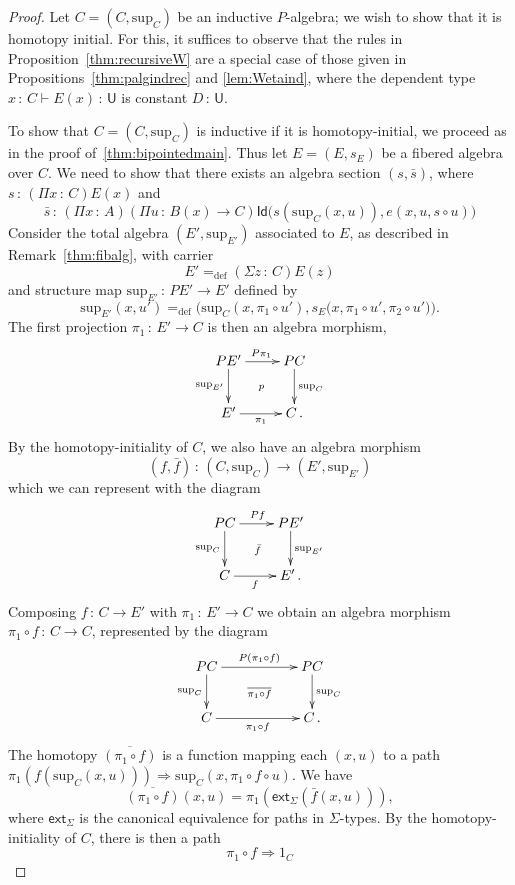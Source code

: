 \documentclass[10pt,a4paper,oneside,reqno]{amsart}
\theoremstyle{mythm}
\theoremstyle{mydef}
\theoremstyle{myrmk}
\newcommand{\defeq}{=_{\mathrm{def}}}
\newcommand{\co}{\,{:}\,}
\newcommand{\com}{\circ}
\newcommand{\ext}{\mathsf{ext}}
\newcommand{\idtodpair}{\ext_\Sigma}
\newcommand{\Id}{\mathsf{Id}}
\newcommand{\U}{\mathsf{U}}
\renewcommand{\sup}{\mathrm{sup}}
\begin{document}
\begin{proof}
Let $C = (C, \sup_C)$ be an inductive $P$-algebra; we wish to show that it is homotopy initial.
For this, it suffices to observe that the rules in Proposition~\ref{thm:recursiveW} are a special case of those given in Propositions~\ref{thm:palgindrec} and \ref{lem:Wetaind}, where the dependent type $x \co C \vdash E(x) \co \U$ is constant $D \co \U$.

To show that $C = (C, \sup_C)$ is inductive if it is homotopy-initial, we proceed as in the proof of~\ref{thm:bipointedmain}. 
Thus let $E = (E, s_E)$ be a fibered algebra over $C$. We need to show that there
exists an algebra section $(s, \bar{s})$, where $s \co (\Pi x \co C) E(x)$ and 
\[ 
\bar{s} \co (\Pi x \co A)(\Pi u \co B(x) \to C) \Id \big( s(\sup_C(x,u)), e(x, u, s \circ u) \big)
\]
%
Consider the total algebra $(E', \sup_{E'})$ associated to $E$, as described in Remark~\ref{thm:fibalg}, with carrier 
\[
E' \defeq (\Sigma z \co C) E(z) 
\]
and structure map $\sup_{E'} \co PE' \to E'$ defined by
\[
\sup_{E'}(x,u') \defeq \Big(\sup_C(x,\pi_1 \circ u'), s_E\big(x,\pi_1 \circ u', \pi_2 \circ u'\big)\Big) .
\]
The first projection $\pi_1 \co E' \to C$ is then an algebra morphism,
\[
\xymatrix{
PE' \ar[r]^{P\pi_1} \ar[d]_-{\sup_{E'}} \ar@{}[rd]|{p} & PC \ar[d]^{\sup_C} \\ 
E'  \ar[r]_-{\pi_1} & C \, .}
 \]
%
By the homotopy-initiality of $C$, we also have an algebra morphism 
\[
(f, \bar{f}) \co (C, \sup_C)  \to (E', \sup_{E'}) 
\]
which we can represent with the diagram
\[
\xymatrix{
PC \ar[r]^{Pf} \ar[d]_-{\sup_{C}} \ar@{}[rd]|{\bar{f}} & PE' \ar[d]^{\sup_{E'}} \\ 
C  \ar[r]_-{f} & E' \, .}
 \]
%
Composing $f \co C \to E'$ with $\pi_1 \co E' \to C$ we obtain an algebra morphism $\pi_1 \com f \co C \to C$, represented by the diagram
\[
\xymatrix{
PC \ar[rr]^{P(\pi_1 \com f)} \ar[d]_-{\sup_{C}} \ar@{}[rrd]|{\overline{\pi_1 \com f}} && PC \ar[d]^{\sup_{C}} \\ 
C  \ar[rr]_-{\pi_1 \com f} && C \, .}
 \]
%
The homotopy $\overline{(\pi_1 \com f)}$ is a function mapping each $(x,u)$ to
a path $\pi_1(f(\sup_C(x,u))) \Rightarrow \sup_C(x, \pi_1 \circ f \circ u)$. We have
\[
\overline{(\pi_1 \com f)}(x,u) = \pi_1(\idtodpair(\bar{f}(x,u))) ,
\]
where $\idtodpair$ is the canonical equivalence for paths in $\Sigma$-types. 
By the homotopy-initiality of $C$,  there is then a path
\begin{equation*}
\pi_1 \circ f \Rightarrow 1_C 
\end{equation*}

\end{proof}
\end{document}
